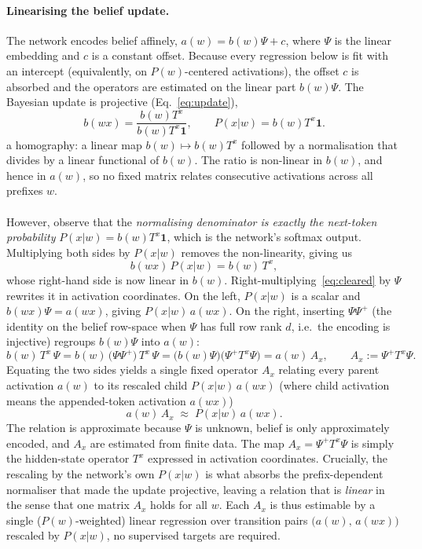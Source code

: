 \documentclass[11pt]{article}
\begin{document}
\paragraph{Linearising the belief update.}
The network encodes belief affinely, $a(w) = b(w)\Psi + c$, where $\Psi$
is the linear embedding and $c$ is a constant offset. Because every regression 
below is fit with an intercept (equivalently, on $P(w)$-centered activations), 
the offset $c$ is absorbed and the operators are estimated on the linear part $b(w)\Psi$.
The Bayesian update is projective (Eq.~\eqref{eq:update}),
\begin{equation}
b(wx)=\frac{b(w)T^x}{b(w)T^x\mathbf{1}}, \qquad P(x|w)=b(w)T^x\mathbf{1}.
\label{eq:update}
\end{equation}
a homography: a linear map $b(w)\mapsto b(w)T^x$ followed by a normalisation that divides
by a linear functional of $b(w)$. The ratio is non-linear in $b(w)$, and hence in
$a(w)$, so no fixed matrix relates consecutive activations across all prefixes $w$.
\\\\
However, observe that the \emph{normalising denominator is exactly the next-token
probability} $P(x|w)=b(w)T^x\mathbf{1}$, which is the network's softmax output.
Multiplying both sides by $P(x|w)$ removes the non-linearity, giving us
\begin{equation}
b(wx)\,P(x|w)=b(w)\,T^x,
\label{eq:cleared}
\end{equation}
whose right-hand side is now linear in $b(w)$. Right-multiplying~\eqref{eq:cleared} by
$\Psi$ rewrites it in activation coordinates. On the left, $P(x|w)$ is a scalar and
$b(wx)\Psi=a(wx)$, giving $P(x|w)\,a(wx)$. On the right, inserting $\Psi\Psi^{+}$
(the identity on the belief row-space when $\Psi$ has full row rank $d$, i.e.\ the
encoding is injective) regroups $b(w)\Psi$ into $a(w)$:
\[
b(w)\,T^x\,\Psi
=b(w)\,\big(\Psi\Psi^{+}\big)\,T^x\,\Psi
=\big(b(w)\Psi\big)\big(\Psi^{+}T^x\Psi\big)
=a(w)\,A_x,
\qquad A_x:=\Psi^{+}T^x\Psi .
\]
Equating the two sides yields a single fixed operator $A_x$ relating every parent
activation $a(w)$ to its rescaled child $P(x|w)\,a(wx)$ (where child activation means the appended-token
activation $a(wx)$)
\begin{equation}
a(w)\,A_x \;\approx\; P(x|w)\,a(wx).
\label{eq:linearise}
\end{equation}
The relation is approximate because $\Psi$ is unknown, belief is only approximately encoded,
and $A_x$ are estimated from finite data. The map $A_x=\Psi^{+}T^x\Psi$ is simply the hidden-state 
operator $T^x$ expressed in activation coordinates. Crucially, the rescaling by the network's own 
$P(x|w)$ is what absorbs the prefix-dependent normaliser that made the update projective, leaving 
a relation that is \emph{linear} in the sense that one matrix $A_x$ holds for all $w$. Each $A_x$ 
is thus estimable by a single ($P(w)$-weighted) linear regression over transition pairs 
$\big(a(w),\,a(wx)\big)$ rescaled by $P(x|w)$, no supervised targets are required.
\end{document}
